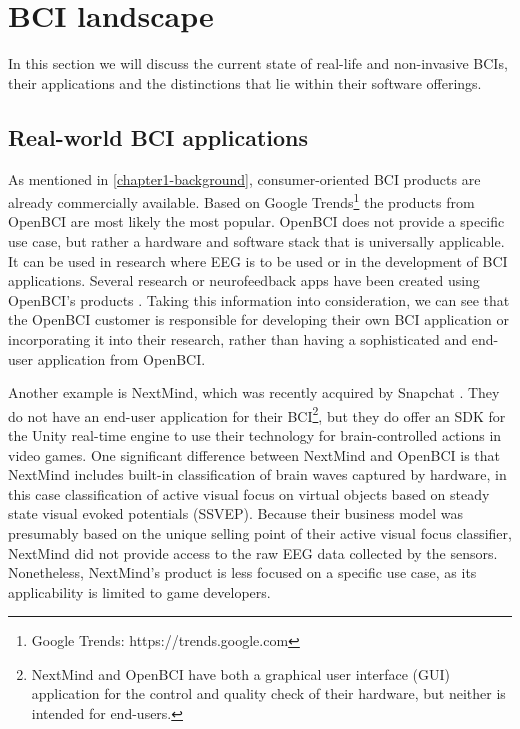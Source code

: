 \section{BCI landscape}
\label{chapter2-research-landscape}

In this section we will discuss the current state of real-life and non-invasive BCIs, their applications and the distinctions that lie within their software offerings.

\subsection{Real-world BCI applications}
\label{chapter2-real-world-bci-applications}

As mentioned in \autoref{chapter1-background}, consumer-oriented BCI products are already commercially available. Based on Google Trends\footnote{Google Trends: https://trends.google.com} the products from OpenBCI are most likely the most popular. OpenBCI does not provide a specific use case, but rather a hardware and software stack that is universally applicable. It can be used in research where EEG is to be used or in the development of BCI applications. Several research or neurofeedback apps have been created using OpenBCI's products \citep{openbci_openbci_nodate}. Taking this information into consideration, we can see that the OpenBCI customer is responsible for developing their own BCI application or incorporating it into their research, rather than having a sophisticated and end-user application from OpenBCI.

Another example is NextMind, which was recently acquired by Snapchat \citep{heater_snap_2022}. They do not have an end-user application for their BCI\footnote{NextMind and OpenBCI have both a graphical user interface (GUI) application for the control and quality check of their hardware, but neither is intended for end-users.}, but they do offer an SDK for the Unity real-time engine to use their technology for brain-controlled actions in video games. One significant difference between NextMind and OpenBCI is that NextMind includes built-in classification of brain waves captured by hardware, in this case classification of active visual focus on virtual objects based on steady state visual evoked potentials (SSVEP). Because their business model was presumably based on the unique selling point of their active visual focus classifier, NextMind did not provide access to the raw EEG data collected by the sensors. Nonetheless, NextMind's product is less focused on a specific use case, as its applicability is limited to game developers.

